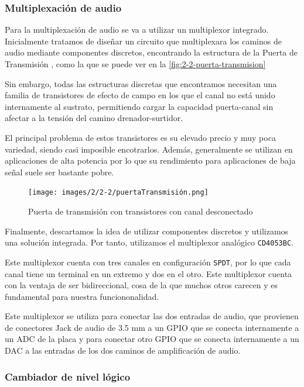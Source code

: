 \subsubsection{Multiplexación de audio}

Para la multiplexación de audio se va a utilizar un multiplexor integrado. Inicialmente tratamos de diseñar un circuito que multiplexara los caminos de audio mediante componentes discretos, encontrando la estructura de la Puerta de Transmisión \cite{TransmissionGate}, como la que se puede ver en la \autoref{fig:2-2-puerta-transmision}

Sin embargo, todas las estructuras discretas que encontramos necesitan una familia de transistores de efecto de campo en los que el canal no está unido internamente al sustrato, permitiendo cargar la capacidad puerta-canal sin afectar a la tensión del camino drenador-surtidor. 

El principal problema de estos transistores es su elevado precio y muy poca variedad, siendo casi imposible encotrarlos. Además, generalmente se utilizan en aplicaciones de alta potencia por lo que su rendimiento para aplicaciones de baja señal suele ser bastante pobre.

\begin{figure}[h]
    \centering
    \texttt{[image: images/2/2-2/puertaTransmisión.png]}
    \caption{Puerta de transmisión con transistores con canal desconectado}
    \label{fig:2-2-puerta-transmision}
\end{figure}

Finalmente, descartamos la idea de utilizar componentes discretos y utilizamos una solución integrada. Por tanto, utilizamos el multiplexor analógico \texttt{CD4053BC}. \cite{CD4053BDataSheet}

Este multiplexor cuenta con tres canales en configuración \texttt{SPDT}, por lo que cada canal tiene un terminal en un extremo y dos en el otro. Este multiplexor cuenta con la ventaja de ser bidireccional, cosa de la que muchos otros carecen y es fundamental para nuestra funciononalidad.

Este multiplexor se utiliza para conectar las dos entradas de audio, que provienen de conectores Jack de audio de 3.5 mm a un GPIO que se conecta internamente a un ADC de la placa y para conectar otro GPIO que se conecta internamente a un DAC a las entradas de los dos caminos de amplificación de audio. 

\subsubsection{Cambiador de nivel lógico}

